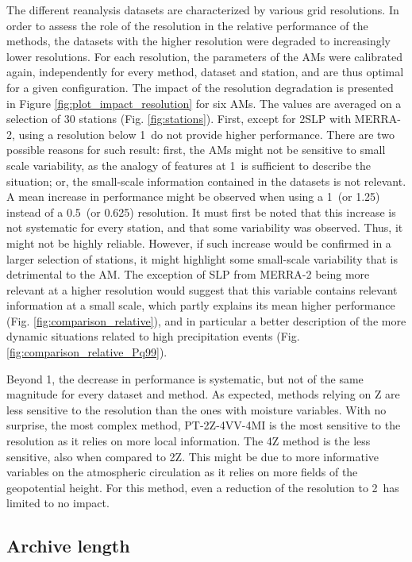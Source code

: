 \documentclass{ametsoc}
\begin{document}
The different reanalysis datasets are characterized by various grid resolutions. In order to assess the role of the resolution in the relative performance of the methods, the datasets with the higher resolution were degraded to increasingly lower resolutions. For each resolution, the parameters of the AMs were calibrated again, independently for every method, dataset and station, and are thus optimal for a given configuration. The impact of the resolution degradation is presented in Figure \ref{fig:plot_impact_resolution} for six AMs. The values are averaged on a selection of 30 stations (Fig. \ref{fig:stations}). First, except for 2SLP with MERRA-2, using a resolution below 1\degree\ do not provide higher performance. There are two possible reasons for such result: first, the AMs might not be sensitive to small scale variability, as the analogy of features at 1\degree\ is sufficient to describe the situation; or, the small-scale information contained in the datasets is not relevant. A mean increase in performance might be observed when using a 1\degree\ (or 1.25\degree) instead of a 0.5\degree\ (or 0.625\degree) resolution. It must first be noted that this increase is not systematic for every station, and that some variability was observed. Thus, it might not be highly reliable. However, if such increase would be confirmed in a larger selection of stations, it might highlight some small-scale variability that is detrimental to the AM. The exception of SLP from MERRA-2 being more relevant at a higher resolution would suggest that this variable contains relevant information at a small scale, which partly explains its mean higher performance (Fig. \ref{fig:comparison_relative}), and in particular a better description of the more dynamic situations related to high precipitation events (Fig. \ref{fig:comparison_relative_Pq99}).

Beyond 1\degree, the decrease in performance is systematic, but not of the same magnitude for every dataset and method. As expected, methods relying on Z are less sensitive to the resolution than the ones with moisture variables. With no surprise, the most complex method, PT-2Z-4VV-4MI is the most sensitive to the resolution as it relies on more local information. The 4Z method is the less sensitive, also when compared to 2Z. This might be due to more informative variables on the atmospheric circulation as it relies on more fields of the geopotential height. For this method, even a reduction of the resolution to 2\degree\ has limited to no impact.


\subsection{Archive length}
\label{sec:length}
\end{document}
